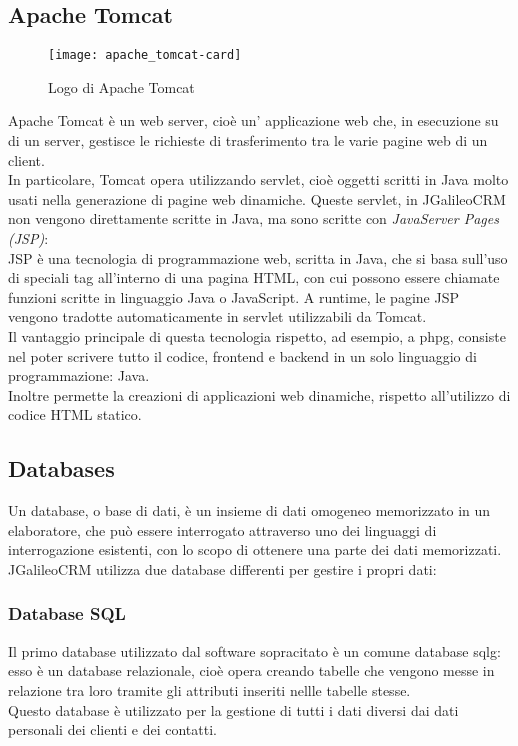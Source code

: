 \subsection{Apache Tomcat}
\begin{figure}[h]
	\centering
	\texttt{[image: apache\_tomcat-card]}
	\caption{Logo di Apache Tomcat}
\end{figure}
Apache Tomcat è un web server, cioè un' applicazione web che, in esecuzione su di un server, gestisce le richieste di trasferimento tra le varie pagine web di un client.\\
In particolare, Tomcat opera utilizzando servlet, cioè oggetti scritti in Java molto usati nella generazione di pagine web dinamiche.
Queste servlet, in JGalileoCRM non vengono direttamente scritte in Java, ma sono scritte con \emph{JavaServer Pages (JSP)}:\\
JSP è una tecnologia di programmazione web, scritta in Java, che si basa sull'uso di speciali tag all'interno di una pagina HTML, con cui possono essere chiamate funzioni scritte in linguaggio Java o JavaScript.
A runtime, le pagine JSP vengono tradotte automaticamente in servlet utilizzabili da Tomcat. \\
Il vantaggio principale di questa tecnologia rispetto, ad esempio, a \gls{phpg}, consiste nel poter scrivere tutto il codice, frontend e backend in un solo linguaggio di programmazione: Java. \\
Inoltre permette la creazioni di applicazioni web dinamiche, rispetto all'utilizzo di codice HTML statico.
\subsection{Databases}
Un database, o base di dati, è un insieme di dati omogeneo memorizzato in un elaboratore, che può essere interrogato attraverso uno dei linguaggi di interrogazione esistenti, con lo scopo di ottenere una parte dei dati memorizzati.
JGalileoCRM utilizza due database differenti per gestire i propri dati:
\subsubsection{Database SQL}
Il primo database utilizzato dal software sopracitato è un comune database \gls{sqlg}: esso è un database relazionale, cioè opera creando tabelle che vengono messe in relazione tra loro tramite gli attributi inseriti nellle tabelle stesse.\\
Questo database è utilizzato per la gestione di tutti i dati diversi dai dati personali dei clienti e dei contatti. %
